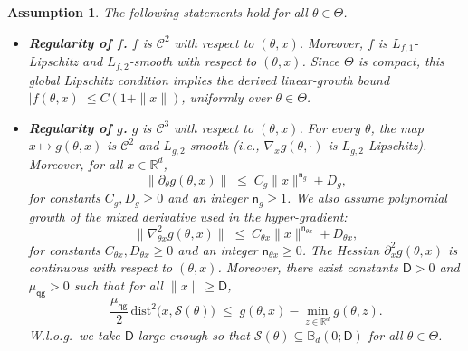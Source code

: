 \documentclass{article}
\theoremstyle{normaltheorem}
\newtheorem{assumption}{Assumption}
\newcommand{\R}{\mathbb{R}}
\newcommand{\calS}{\mathcal{S}}
\begin{document}
\begin{tcolorbox}[colback=gray!20, colframe=gray!50, boxrule=0pt, arc=0mm, left=0mm, right=0mm, top=0mm, bottom=0mm, breakable]
\begin{assumption}\label{assum_sample_comp}
The following statements hold for all \(\theta\in\Theta\).
\begin{itemize}[leftmargin=*]\setlength{\itemsep}{0.5pt}
\item \textbf{Regularity of \(f\).}
\(f\) is \(\mathcal{C}^{2}\) with respect to \((\theta,x)\). Moreover, \(f\) is \(L_{f,1}\)-Lipschitz and \(L_{f,2}\)-smooth with respect to \((\theta,x)\).
Since \(\Theta\) is compact, this global Lipschitz condition implies the derived linear-growth bound
\(|f(\theta,x)|\le C(1+\|x\|)\), uniformly over \(\theta\in\Theta\).

\item \textbf{Regularity of \(g\).}
\(g\) is \(\mathcal{C}^{3}\) with respect to \((\theta,x)\).
For every \(\theta\), the map \(x\mapsto g(\theta,x)\) is \(\mathcal{C}^{2}\) and \(L_{g,2}\)-smooth (i.e., \(\nabla_x g(\theta,\cdot)\) is \(L_{g,2}\)-Lipschitz).
Moreover, for all \(x\in\R^{d}\),
\[
\|\partial_{\theta}g(\theta,x)\| \;\le\; C_{g}\|x\|^{\mathsf{n}_{g}} + D_{g},
\]
for constants \(C_{g},D_{g}\ge 0\) and an integer \(\mathsf{n}_{g}\ge 1\).
We also assume polynomial growth of the mixed derivative used in the hyper-gradient:
\[
\|\nabla^2_{\theta x}g(\theta,x)\| \;\le\; C_{\theta x}\|x\|^{\mathsf{n}_{\theta x}} + D_{\theta x},
\]
for constants \(C_{\theta x},D_{\theta x}\ge 0\) and an integer \(\mathsf{n}_{\theta x}\ge 0\).
The Hessian \(\partial_x^2 g(\theta,x)\) is continuous with respect to \((\theta,x)\).
Moreover, there exist constants \(\mathsf{D}>0\) and \(\mu_{\mathsf{qg}}>0\) such that for all \(\|x\|\ge \mathsf{D}\),
\[
\frac{\mu_{\mathsf{qg}}}{2}\,\mathrm{dist}^{2}\!\bigl(x,\calS(\theta)\bigr)
\;\le\;
g(\theta,x)-\min_{z\in\R^{d}} g(\theta,z).
\]
W.l.o.g.\ we take \(\mathsf{D}\) large enough so that \(\calS(\theta)\subseteq \mathbb B_d(0;\mathsf{D})\) for all \(\theta\in\Theta\).
\end{itemize}
\end{assumption}
\end{tcolorbox}
\end{document}
